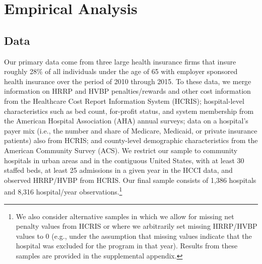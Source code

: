\documentclass[12pt]{article}
\begin{document}
\section{Empirical Analysis}
\label{sec:Empirical}

\subsection{Data}
Our primary data come from three large health insurance firms that insure roughly 28$\%$ of all individuals under the age of 65 with employer sponsored health insurance over the period of 2010 through 2015.  To these data, we merge information on HRRP and HVBP penalties/rewards and other cost information from the Healthcare Cost Report Information System (HCRIS); hospital-level characteristics such as bed count, for-profit status, and system membership from the American Hospital Association (AHA) annual surveys; data on a hospital's payer mix (i.e., the number and share of Medicare, Medicaid, or private insurance patients) also from HCRIS; and county-level demographic characteristics from the American Community Survey (ACS).  We restrict our sample to community hospitals in urban areas and in the contiguous United States, with at least 30 staffed beds, at least 25 admissions in a given year in the HCCI data, and observed HRRP/HVBP from HCRIS. Our final sample consists of 1,386 hospitals and 8,316 hospital/year observations.\footnote{We also consider alternative samples in which we allow for missing net penalty values from HCRIS or where we arbitrarily set missing HRRP/HVBP values to 0 (e.g., under the assumption that missing values indicate that the hospital was excluded for the program in that year). Results from these samples are provided in the supplemental appendix.}
\end{document}
